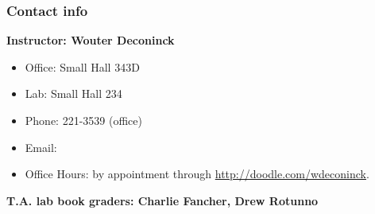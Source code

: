 \documentclass[beamer]{standalone}
\begin{document}


\begin{frame}
\frametitle{Contact info}
{\bf Instructor: Wouter Deconinck}
\begin{itemize}
 \item Office: Small Hall 343D
 \item Lab: Small Hall 234
 \item Phone: 221-3539 (office)
 \item Email: 
 \item Office Hours: by appointment through \url{http://doodle.com/wdeconinck}.
\end{itemize}

{\bf T.A. lab book graders: Charlie Fancher, Drew Rotunno}

\end{frame}
\end{document}
